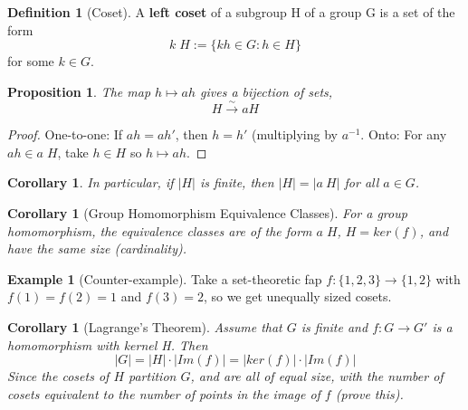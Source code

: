 \documentclass[12pt]{article}
\newtheorem{cor}[thm]{Corollary}
\newtheorem{prop}[thm]{Proposition}
\theoremstyle{definition}
\newtheorem{defn}[thm]{Definition}
\newtheorem{eg}[thm]{Example}
\theoremstyle{remark}
\numberwithin{equation}{section}
\newcommand\B[1]{\textbf{ #1}}
\begin{document}
\vspace{15pt}

\begin{defn}[Coset]
        A \B{left coset} of a subgroup H of a group G is a set of the form \begin{equation}
                k\;H := \{kh \in G: h \in H\}
        \end{equation}
        for some $k \in G$.
\end{defn}

\vspace{15pt}

\begin{prop}
        The map $h \mapsto ah$ gives a bijection of sets, \begin{equation}
                H \xrightarrow{\sim} aH
        \end{equation}
\end{prop}
\begin{proof}
        One-to-one: If $ah = ah'$, then $h = h'$ (multiplying by $a^{-1}$.
        Onto: For any $ah \in a\;H$, take $h \in H$ so $h \mapsto ah$.
\end{proof}

\vspace{15pt}

\begin{cor}
        In particular, if $|H|$ is finite, then $|H| = |a\:H|$ for all $a \in G$.
\end{cor}

\vspace{15pt}


\begin{cor}[Group Homomorphism Equivalence Classes]
        For a group homomorphism, the equivalence classes are of the form $a\;H$, $H = ker(f)$, and have the same size (cardinality).
\end{cor}


\vspace{15pt}


\begin{eg}[Counter-example]
        Take a set-theoretic fap $f:\{1,2,3\} \rightarrow \{1,2\}$ with $f(1) = f(2) = 1$ and $f(3) = 2$, so we get unequally sized cosets.
\end{eg}

\vspace{15pt}


\begin{cor}[Lagrange's Theorem]
        Assume that $G$ is finite and $f: G\rightarrow G'$ is a homomorphism with kernel H. Then \begin{equation}
                |G| = |H|\cdot|Im(f)| = |ker(f)|\cdot |Im(f)|
        \end{equation}
        Since the cosets of $H$ partition $G$, and are all of equal size, with the number of cosets equivalent to the number of points in the image of $f$ (prove this).
\end{cor}
\end{document}
